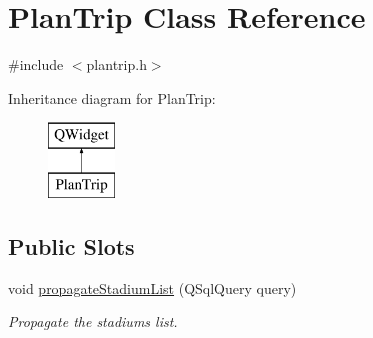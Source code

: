 \hypertarget{class_plan_trip}{}\section{Plan\+Trip Class Reference}
\label{class_plan_trip}


{\ttfamily \#include $<$plantrip.\+h$>$}

Inheritance diagram for Plan\+Trip\+:\begin{figure}[H]
\begin{center}
\leavevmode
\includegraphics[height=2.000000cm]{class_plan_trip}
\end{center}
\end{figure}
\subsection*{Public Slots}
\begin{DoxyCompactItemize}
\item 
void \hyperlink{class_plan_trip_ad4e718e750e17dd0f28439a09fa65d0d}{propagate\+Stadium\+List} (Q\+Sql\+Query query)
\begin{DoxyCompactList}\small\item\em Propagate the stadiums list. \end{DoxyCompactList}\end{DoxyCompactItemize}
